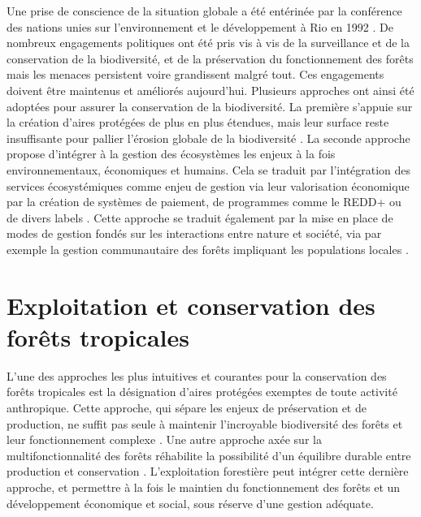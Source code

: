 \documentclass[
  11pt,
  french,
  A4paper,
  extrafontsizes,onecolumn,openright
  ]{memoir}
\begin{document}
Une prise de conscience de la situation globale a été entérinée par la
conférence des nations unies sur l'environnement et le développement à
Rio en 1992 \autocites{Schlaepfer2000}{Dirzo2003a}{Morales-Hidalgo2015}.
De nombreux engagements politiques ont été pris vis à vis de la
surveillance et de la conservation de la biodiversité, et de la
préservation du fonctionnement des forêts mais les menaces persistent
voire grandissent malgré tout. Ces engagements doivent être maintenus et
améliorés aujourd'hui. Plusieurs approches ont ainsi été adoptées pour
assurer la conservation de la biodiversité. La première s'appuie sur la
création d'aires protégées de plus en plus étendues, mais leur surface
reste insuffisante pour pallier l'érosion globale de la biodiversité
\autocite{Sist2015}. La seconde approche propose d'intégrer à la gestion
des écosystèmes les enjeux à la fois environnementaux, économiques et
humains. Cela se traduit par l'intégration des services écosystémiques
comme enjeu de gestion via leur valorisation économique par la création
de systèmes de paiement, de programmes comme le REDD+ ou de divers
labels \autocites{Agrawal2011}{Barlow2018}. Cette approche se traduit
également par la mise en place de modes de gestion fondés sur les
interactions entre nature et société, via par exemple la gestion
communautaire des forêts impliquant les populations locales
\autocite{Liu2015}.

\section{Exploitation et conservation des forêts
tropicales}\label{exploitation-et-conservation-des-forets-tropicales}

L'une des approches les plus intuitives et courantes pour la
conservation des forêts tropicales est la désignation d'aires protégées
exemptes de toute activité anthropique. Cette approche, qui sépare les
enjeux de préservation et de production, ne suffit pas seule à maintenir
l'incroyable biodiversité des forêts et leur fonctionnement complexe
\autocite{Sist2015}. Une autre approche axée sur la multifonctionnalité
des forêts réhabilite la possibilité d'un équilibre durable entre
production et conservation \autocite{Loos2018}. L'exploitation
forestière peut intégrer cette dernière approche, et permettre à la fois
le maintien du fonctionnement des forêts et un développement économique
et social, sous réserve d'une gestion adéquate.
\end{document}
